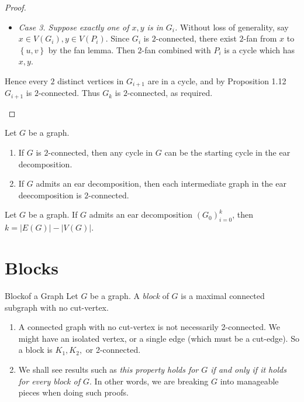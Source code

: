 \documentclass[co342]{subfiles}
\begin{document}
\begin{proof}
\begin{itemize}
\begin{itemize}
                    \item \textit{Case 3. Suppose exactly one of $x,y$ is in $G_i$.} Without loss of generality, say $x\in V\left( G_i \right), y\in V\left( P_i \right)$. Since $G_i$ is $2$-connected, there exist $2$-fan from $x$ to $\left\lbrace u,v \right\rbrace$ by the fan lemma. Then $2$-fan combined with $P_i$ is a cycle which has $x,y$.
                \end{itemize} 
                Hence every $2$ distinct vertices in $G_{i+1}$ are in a cycle, and by Proposition 1.12 $G_{i+1}$ is $2$-connected. Thus $G_k$ is $2$-connected, as required. \qqedsym
        \end{itemize} 
    \end{proof}

    \clearpage
    \begin{cor}{}
        Let $G$ be a graph.
        \begin{enumerate}
            \item If $G$ is $2$-connected, then any cycle in $G$ can be the starting cycle in the ear decomposition.
            \item If $G$ admits an ear decomposition, then each intermediate graph in the ear deecomposition is $2$-connected.
        \end{enumerate}
    \end{cor}

    \begin{prop}{}
        Let $G$ be a graph. If $G$ admits an ear decomposition $\left( G_{0} \right)^{k}_{i=0}$, then $k=\left| E\left( G \right) \right|-\left| V\left( G \right) \right|$.
    \end{prop}

    \section{Blocks}
    
    \begin{definition}{Block}{of a Graph}
        Let $G$ be a graph. A \emph{block} of $G$ is a maximal connected subgraph with no cut-vertex.
    \end{definition}

    \np
    \begin{enumerate}
        \item A connected graph with no cut-vertex is not necessarily 2-connected. We might have an isolated vertex, or a single edge (which must be a cut-edge). So a block is $K_1, K_2,$ or 2-connected.
        \item We shall see results such as \textit{this property holds for $G$ if and only if it holds for every block of $G$}. In other words, we are breaking $G$ into manageable pieces when doing such proofs.
    \end{enumerate}
\end{document}
